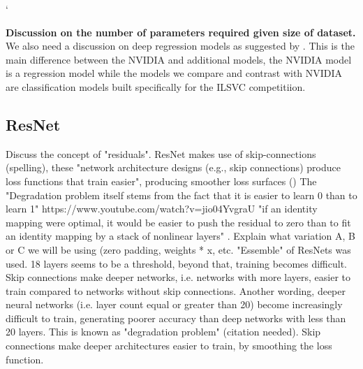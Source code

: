 
`  

\textbf{Discussion on the number of parameters required given size of dataset.}  
We also need a discussion on deep regression models as suggested by \cite{lathuilire2018comprehensive}. This is the main difference between the NVIDIA and additional models, the NVIDIA model is a regression model while the models we compare and contrast with NVIDIA are classification models built specifically for the ILSVC  competitiion.

\subsection{ResNet}

Discuss the concept of "residuals". ResNet makes use of skip-connections (spelling), these "network architecture
designs (e.g., skip connections) produce loss functions that train easier", producing smoother loss surfaces (\cite{li2017visualizing})  
The "Degradation problem itself stems from the fact that it is easier to learn 0 than to learn 1"   https://www.youtube.com/watch?v=jio04YvgraU
"if an identity mapping were optimal, it would be easier to push the residual to zero than to fit an identity mapping by a stack of nonlinear layers" \cite{he2015deep}.  
Explain what variation A, B or C we will be using (zero padding, weights * x, etc.  
"Essemble" of ResNets was used.  
18 layers seems to be a threshold, beyond that, training becomes difficult. Skip connections make deeper networks, i.e. networks with more layers, easier to train compared to networks without skip connections.  
Another wording, deeper neural networks (i.e. layer count equal or greater than 20) become increasingly difficult to train, generating poorer accuracy than deep networks with less than 20 layers. This is known as "degradation problem" (citation needed). Skip connections make deeper architectures easier to train, by smoothing the loss function.

